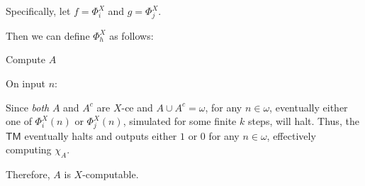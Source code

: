 \begin{problem}
\begin{answer}
    Specifically, let $f = \Phi_i^X$ and $g = \Phi_j^X$.

    Then we can define $\Phi_h^X$ as follows:

    \step
    \begin{algorithm}[H]
      \caption{Compute $A$}
      On input $n$: \\
    \end{algorithm}

    \step
    Since \emph{both} $A$ and $A^c$ are $X$-ce
    and $A \cup A^c = \omega$,
    for any $n \in \omega$, eventually either one of
    $\Phi_i^X(n)$ or $\Phi_j^X(n)$, simulated for some finite $k$ steps,
    will halt.
    Thus, the $\mathsf{TM}$ eventually halts and outputs either
    $1$ or $0$ for any $n \in \omega$, effectively computing
    $\chi_A$.

    \step
    Therefore, $A$ is $X$-computable.
  \end{answer}
\end{problem}
